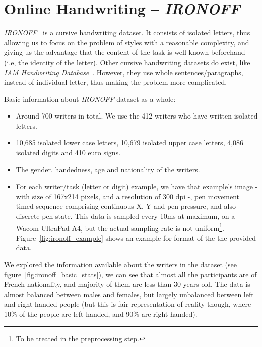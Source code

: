 \clearpage

\section{Online Handwriting -- \textit{IRONOFF}}

\par \textit{IRONOFF}~\citep{791823} is a cursive handwriting dataset. It consists of isolated letters, thus allowing us to focus on the problem of styles with a reasonable complexity, and giving us the advantage that the content of the task is well known beforehand (i.e, the identity of the letter). Other cursive handwriting datasets do exist, like \textit{IAM Handwriting Database}~\citep{marti1999full}. However, they use whole sentences/paragraphs, instead of individual letter, thus making the problem more complicated.

Basic information about \textit{IRONOFF} dataset as a whole:
\begin{itemize}
    \item Around 700 writers in total. We use the 412 writers who have written isolated letters.
    \item 10,685 isolated lower case letters, 10,679 isolated upper case letters, 4,086 isolated digits and 410 euro signs.
    \item The gender, handedness, age and nationality of the writers.
    \item For each writer/task (letter or digit) example, we have that example's image - with size of 167x214 pixels, and a resolution of 300 dpi -, pen movement timed sequence comprising continuous X, Y and pen pressure, and also discrete pen state. This data is sampled every 10ms at maximum, on a Wacom UltraPad A4, but the actual sampling rate is not uniform\footnote{To be treated in the preprocessing step.}. Figure~\ref{fig:ironoff_example} shows an example for format of the the provided data.
\end{itemize}

\par We explored the information available about the writers in the dataset (see figure~\ref{fig:ironoff_basic_stats}), we can see that almost all the participants are of French nationality, and majority of them are less than 30 years old. The data is almost balanced between males and females, but largely unbalanced between left and right handed people (but this is fair representation of reality though, where 10\% of the people are left-handed, and 90\% are right-handed). %

